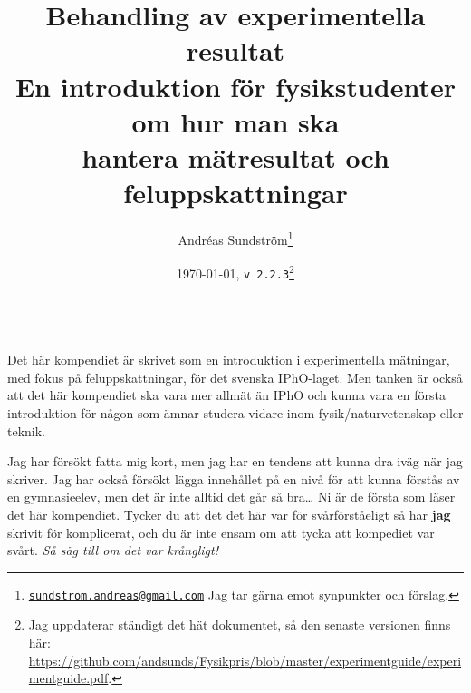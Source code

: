 \documentclass[11pt,a4paper, swedish
]{article}
\begin{document}
\title{\huge Behandling av experimentella resultat\\[2mm] 
\Large En introduktion för fysikstudenter om hur man ska\\ hantera
mätresultat och feluppskattningar}
\author{
Andréas Sundström\footnote{
\href{mailto:sundstrom.andreas@gmail.com}{\nolinkurl{sundstrom.andreas@gmail.com}}
\: Jag tar gärna emot synpunkter och förslag.}
}
\date{\today, \quad\texttt{v\,2.2.3}\footnote{Jag uppdaterar ständigt
    det hät dokumentet, så den senaste versionen finns här: \url{https://github.com/andsunds/Fysikpris/blob/master/experimentguide/experimentguide.pdf}.}}
\maketitle





\\[1mm]
\small
Det här kompendiet är skrivet som en introduktion i experimentella
mätningar, med fokus på feluppskattningar, för det svenska
IPhO-laget. Men tanken är också att det här kompendiet ska vara mer
allmät än IPhO och kunna vara en första introduktion för någon som
ämnar studera vidare inom fysik/naturvetenskap eller teknik. 

Jag har försökt fatta mig kort, men jag har en tendens att
kunna dra iväg när jag skriver. Jag har också försökt lägga innehållet
på en nivå för att kunna förstås av en gymnasieelev, men det är inte
alltid det går så bra\ldots{} Ni är de första som läser det här
kompendiet. Tycker du att det det här var för svårförståeligt så har
\textbf{jag} skrivit för komplicerat, och du är inte ensam om att
tycka att kompediet var svårt. \emph{Så säg till om det var krångligt!} 
\end{document}
